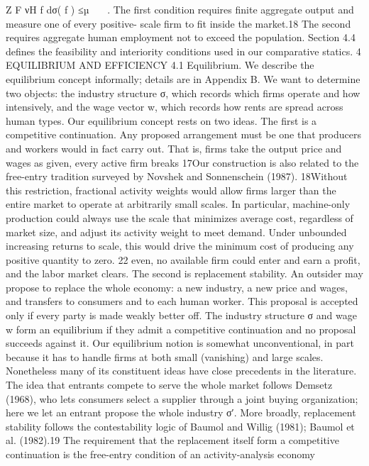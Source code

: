 Z
F νH
f dσ( f ) ≤µ


.
The first condition requires finite aggregate output and measure one of every positive-
scale firm to fit inside the market.18 The second requires aggregate human employment
not to exceed the population.
Section 4.4 defines the feasibility and interiority conditions used in our comparative
statics.
4 EQUILIBRIUM AND EFFICIENCY
4.1 Equilibrium. We describe the equilibrium concept informally; details are in
Appendix B. We want to determine two objects: the industry structure σ, which
records which firms operate and how intensively, and the wage vector w, which
records how rents are spread across human types.
Our equilibrium concept rests on two ideas. The first is a competitive continuation. Any
proposed arrangement must be one that producers and workers would in fact carry
out. That is, firms take the output price and wages as given, every active firm breaks
17Our construction is also related to the free-entry tradition surveyed by Novshek and Sonnenschein
(1987).
18Without this restriction, fractional activity weights would allow firms larger than the entire market
to operate at arbitrarily small scales. In particular, machine-only production could always use the scale
that minimizes average cost, regardless of market size, and adjust its activity weight to meet demand.
Under unbounded increasing returns to scale, this would drive the minimum cost of producing any
positive quantity to zero.
22
even, no available firm could enter and earn a profit, and the labor market clears. The
second is replacement stability. An outsider may propose to replace the whole economy:
a new industry, a new price and wages, and transfers to consumers and to each human
worker. This proposal is accepted only if every party is made weakly better off. The
industry structure σ and wage w form an equilibrium if they admit a competitive
continuation and no proposal succeeds against it.
Our equilibrium notion is somewhat unconventional, in part because it has to handle
firms at both small (vanishing) and large scales. Nonetheless many of its constituent
ideas have close precedents in the literature. The idea that entrants compete to serve the
whole market follows Demsetz (1968), who lets consumers select a supplier through
a joint buying organization; here we let an entrant propose the whole industry σ′.
More broadly, replacement stability follows the contestability logic of Baumol and
Willig (1981); Baumol et al. (1982).19 The requirement that the replacement itself form
a competitive continuation is the free-entry condition of an activity-analysis economy
